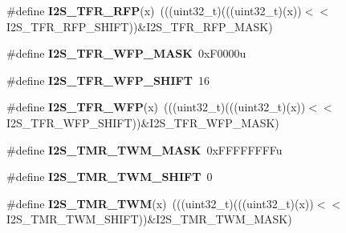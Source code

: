 \begin{DoxyCompactItemize}
\item 
\#define {\bfseries I2\+S\+\_\+\+T\+F\+R\+\_\+\+R\+FP}(x)~(((uint32\+\_\+t)(((uint32\+\_\+t)(x))$<$$<$I2\+S\+\_\+\+T\+F\+R\+\_\+\+R\+F\+P\+\_\+\+S\+H\+I\+FT))\&I2\+S\+\_\+\+T\+F\+R\+\_\+\+R\+F\+P\+\_\+\+M\+A\+SK)\hypertarget{group__I2S__Register__Masks_ga1d3bcbec6628bf077ca879fe9a98e43d}{}\label{group__I2S__Register__Masks_ga1d3bcbec6628bf077ca879fe9a98e43d}

\item 
\#define {\bfseries I2\+S\+\_\+\+T\+F\+R\+\_\+\+W\+F\+P\+\_\+\+M\+A\+SK}~0x\+F0000u\hypertarget{group__I2S__Register__Masks_gae62f96d35bbfdc150f3d3cc9a0a27077}{}\label{group__I2S__Register__Masks_gae62f96d35bbfdc150f3d3cc9a0a27077}

\item 
\#define {\bfseries I2\+S\+\_\+\+T\+F\+R\+\_\+\+W\+F\+P\+\_\+\+S\+H\+I\+FT}~16\hypertarget{group__I2S__Register__Masks_ga76c81603713aba769396b8c4921078c2}{}\label{group__I2S__Register__Masks_ga76c81603713aba769396b8c4921078c2}

\item 
\#define {\bfseries I2\+S\+\_\+\+T\+F\+R\+\_\+\+W\+FP}(x)~(((uint32\+\_\+t)(((uint32\+\_\+t)(x))$<$$<$I2\+S\+\_\+\+T\+F\+R\+\_\+\+W\+F\+P\+\_\+\+S\+H\+I\+FT))\&I2\+S\+\_\+\+T\+F\+R\+\_\+\+W\+F\+P\+\_\+\+M\+A\+SK)\hypertarget{group__I2S__Register__Masks_ga1b920f661b6f4cf70114b456f0e8304c}{}\label{group__I2S__Register__Masks_ga1b920f661b6f4cf70114b456f0e8304c}

\item 
\#define {\bfseries I2\+S\+\_\+\+T\+M\+R\+\_\+\+T\+W\+M\+\_\+\+M\+A\+SK}~0x\+F\+F\+F\+F\+F\+F\+F\+Fu\hypertarget{group__I2S__Register__Masks_ga0c694ab6fec26ca6fc159fe1d8ccb591}{}\label{group__I2S__Register__Masks_ga0c694ab6fec26ca6fc159fe1d8ccb591}

\item 
\#define {\bfseries I2\+S\+\_\+\+T\+M\+R\+\_\+\+T\+W\+M\+\_\+\+S\+H\+I\+FT}~0\hypertarget{group__I2S__Register__Masks_ga50ccb20fbe6c1de252bfe8ffba29fb3e}{}\label{group__I2S__Register__Masks_ga50ccb20fbe6c1de252bfe8ffba29fb3e}

\item 
\#define {\bfseries I2\+S\+\_\+\+T\+M\+R\+\_\+\+T\+WM}(x)~(((uint32\+\_\+t)(((uint32\+\_\+t)(x))$<$$<$I2\+S\+\_\+\+T\+M\+R\+\_\+\+T\+W\+M\+\_\+\+S\+H\+I\+FT))\&I2\+S\+\_\+\+T\+M\+R\+\_\+\+T\+W\+M\+\_\+\+M\+A\+SK)\hypertarget{group__I2S__Register__Masks_gad68d207aaa25383b7b3b2dd23c2a6d13}{}\label{group__I2S__Register__Masks_gad68d207aaa25383b7b3b2dd23c2a6d13}


\end{DoxyCompactItemize}
